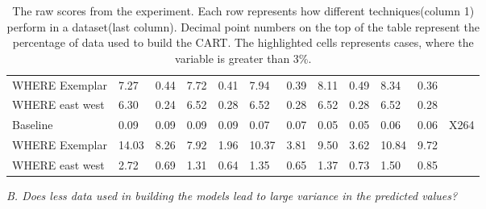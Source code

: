 \documentclass{sig-alternative}
\begin{document}
\begin{table}
\begin{tabular}{|l|l|l|l|l|l|l|l|l|l|ll|}
\multicolumn{1}{|l|}{WHERE Exemplar}  & 7.27                & 0.44             & 7.72                & 0.41              & 7.94                & 0.39             & 8.11                & 0.49             & 8.34                & \multicolumn{1}{l|}{0.36}  &                                           \\
\multicolumn{1}{|l|}{WHERE east west} & 6.30                 & 0.24             & 6.52                & 0.28             & 6.52                & 0.28             & 6.52                & 0.28           & 6.52                & \multicolumn{1}{l|}{0.28}  &                                           \\ \hline
\multicolumn{1}{|l|}{Baseline}        & 0.09               & 0.09             & 0.09                & 0.09             & 0.07                & 0.07             & 0.05                & 0.05             & 0.06                & \multicolumn{1}{l|}{0.06}  & \multirow{3}{*}{X264} \\
\multicolumn{1}{|l|}{WHERE Exemplar}  & 14.03               & \cellcolor[HTML]{9B9B9B}8.26              & 7.92                 & 1.96             & 10.37               & \cellcolor[HTML]{9B9B9B}3.81             & 9.50                & \cellcolor[HTML]{9B9B9B}3.62             & 10.84               & \multicolumn{1}{l|}{\cellcolor[HTML]{9B9B9B}9.72}  & \multicolumn{1}{c|}{}                      \\
\multicolumn{1}{|l|}{WHERE east west} & 2.72                & 0.69             & 1.31                & 0.64              & 1.35                & 0.65             & 1.37                & 0.73             & 1.50                & \multicolumn{1}{l|}{0.85}  & \multicolumn{1}{c|}{}           \\\hline           

\end{tabular}

\caption{The raw scores from the experiment. Each row represents how different techniques(column 1) perform in a dataset(last column). Decimal point numbers on the top of the table represent the percentage of data used to build the CART. The highlighted cells represents cases, where the variable is greater than 3\%.}
\label{variance_table}
\end{table}

\textit{B. Does less data used in building the models lead to large variance in the predicted values?}\\
\end{document}
